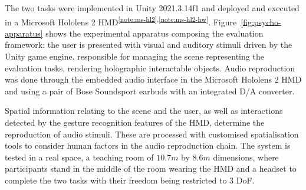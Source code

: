 The two tasks were implemented in Unity 2021.3.14f1 and deployed and executed in a Microsoft Hololens 2 HMD\textsuperscript{\ref{note:ms-hl2},\ref{note:ms-hl2-hw}}. Figure~\ref{fig:psycho-apparatus} shows the experimental apparatus composing the evaluation framework: the user is presented with visual and auditory stimuli driven by the Unity game engine, responsible for managing the scene representing the evaluation tasks, rendering holographic interactable objects. Audio reproduction was done through the embedded audio interface in the Microsoft Hololens 2 HMD and using a pair of Bose Soundsport earbuds with an integrated D/A converter.\par
Spatial information relating to the scene and the user, as well as interactions detected by the gesture recognition features of the HMD, determine the reproduction of audio stimuli. These are processed with customised spatialisation tools to consider human factors in the audio reproduction chain. The system is tested in a real space, a teaching room of $10.7m$ by $8.6m$ dimensions, where participants stand in the middle of the room wearing the HMD and a headset to complete the two tasks with their freedom being restricted to 3 DoF.\par

